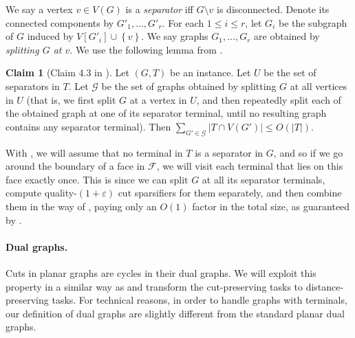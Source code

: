 \documentclass[11pt]{article}
\theoremstyle{definition}
\newtheorem{claim}[theorem]{Claim}
\newcommand{\set}[1]{\left\{ #1 \right\}}
\newcommand{\fset}{{\mathcal{F}}}
\newcommand{\gset}{{\mathcal{G}}}
\newcommand{\eps}{{\varepsilon}}
\newcounter{note}
\begin{document}
We say a vertex $v\in V(G)$ is a \emph{separator} iff $G\setminus v$ is disconnected.
Denote its connected components by $G'_1,\ldots,G'_r$.
For each $1\le i\le r$, let $G_i$ be the subgraph of $G$ induced by $V[G'_i]\cup \set{v}$. We say graphs $G_1,\ldots,G_r$ are obtained by \emph{splitting $G$ at $v$}.
We use the following lemma from \cite{chang2022near}.

\begin{claim}[Claim 4.3 in \cite{chang2022near}]
\label{clm: separator}
Let $(G,T)$ be an instance.
Let $U$ be the set of separators in $T$. Let $\gset$ be the set of graphs obtained by splitting $G$ at all vertices in $U$ (that is, we first split $G$ at a vertex in $U$, and then repeatedly split each of the obtained graph at one of its separator terminal, until no resulting graph contains any separator terminal). Then
$\sum_{G'\in \gset}|T\cap V(G')|\le O(|T|)$.
\end{claim}

With , we will assume that no terminal in $T$ is a separator in $G$, and so if we go around the boundary of a face in $\fset$, we will visit each terminal that lies on this face exactly once. This is since we can split $G$ at all its separator terminals, compute quality-$(1+\eps)$ cut sparsifiers for them separately, and then combine them in the way of , paying only an $O(1)$ factor in the total size, as guaranteed by .

\paragraph{Dual graphs.}
Cuts in planar graphs are cycles in their dual graphs. We will exploit this property in a similar way as \cite{krauthgamer2017refined} and transform the cut-preserving tasks to distance-preserving tasks. For technical reasons, in order to handle graphs with terminals, our definition of dual graphs are slightly different from the standard planar dual graphs.
\end{document}
